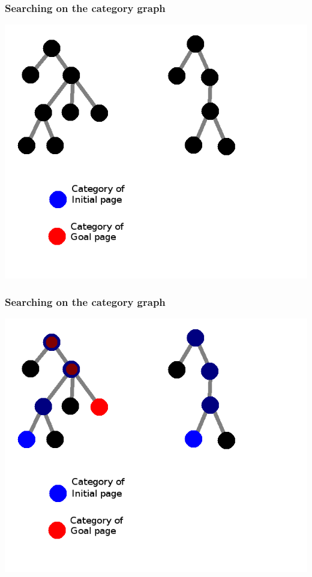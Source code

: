 \documentclass{beamer}
\begin{document}
\begin{frame}
\frametitle{Searching on the category graph}
  \includegraphics[height=0.8\textheight]{img/cats-2.png}
\end{frame}
\begin{frame}
\frametitle{Searching on the category graph}
  \includegraphics[height=0.8\textheight]{img/cats-3a.png}
\end{frame}
\end{document}
